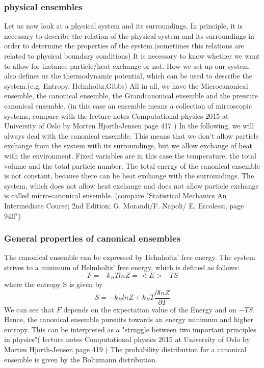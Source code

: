 \documentclass[10pt,a4paper]{article}
\begin{document}
\subsubsection{physical ensembles}
Let us now look at a physical system and its surroundings. 
In principle, it is necessary to describe the relation of the physical system and its surroundings in order to determine the properties of the system.(sometimes this relations are related to physical boundary conditions) It is necessary to know whether we want to allow for instance particle/heat exchange or not. How we set up our system also defines us the thermodynamic potential, which can be used to describe the system.(e.g. Entropy, Helmholtz,Gibbs) All in all, we have the Microcanonical ensemble, the canonical ensemble, the Grandcanonical ensemble and the pressure canonical ensemble. (in this case an ensemble means a collection of mircoscopic systems, compare with the lecture notes Computational physics 2015 at University of Oslo by Morten Hjorth-Jensen page 417 )
In the following, we will always deal with the canonical ensemble. This  means that we don't allow particle exchange from the system with its surroundings, but we allow exchange of heat with the environment. 
Fixed variables are in this case the temperature, the total volume and the total particle number. The total energy of the canonical ensemble is not constant, because there can be heat exchange with the surroundings. The system, which does not allow heat exchange and does not allow particle exchange is called micro-canonical ensemble. (compare "Statistical Mechanics  An Intermediate Course; 2nd Edition; G. Morandi/F. Napoli/ E. Ercolessi; page 94ff") 


\subsubsection{General properties of canonical ensembles}\label{General properties of canonical ensembles}
The canonical ensemble can be expressed by Helmholtz' free energy. The system strives to a minimum of Helmholtz' free energy, which is defined as follows:
\begin{equation}
F=-k_BTlnZ = <E>-TS \label{F}
\end{equation}
where the entropy S is given by
\begin{equation}
S=-k_BlnZ + k_B T \frac{\partial lnZ}{\partial T}\label{S}
\end{equation}
We can see that $F$ depends on the expectation value of the Energy and on $-TS$. 
Hence, the canonical ensemble pursuits towards an energy minimum and higher entropy. This can be interpreted as a "struggle between two important principles in physics"( lecture notes Computational physics 2015 at University of Oslo by Morten Hjorth-Jensen page 419 )
The probability distribution for a canonical ensemble is given by the Boltzmann distribution.
\end{document}
